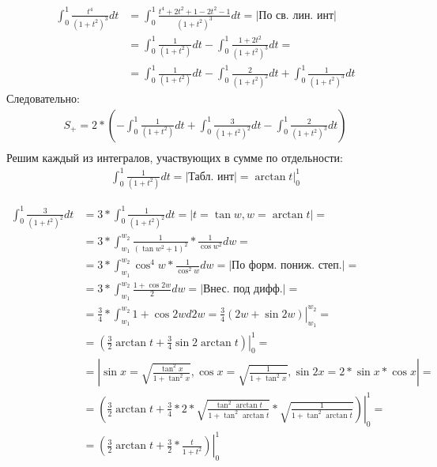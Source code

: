 \documentclass[12pt, a4paper]{article}
\begin{document}
\begin{equation*}
\begin{aligned}
\int_{0}^{1} \frac{t^4}{\left(1+t^2\right)^3} dt &= \int_{0}^{1} \frac{t^4 + 2t^2 + 1 -2t^2 - 1}{\left(1+t^2\right)^3} dt = |\text{По св. лин. инт}|\\
&= \int_{0}^{1} \frac{1}{\left(1+t^2\right)} dt - \int_{0}^{1} \frac{1+2t^2}{\left(1+t^2\right)^3} dt =\\
&= \int_{0}^{1} \frac{1}{\left(1+t^2\right)} dt - \int_{0}^{1} \frac{2}{\left(1+t^2\right)^2} dt + \int_{0}^{1} \frac{1}{\left(1+t^2\right)^3} dt
\end{aligned}
\end{equation*}
Следовательно:
\begin{equation*}
\begin{aligned}
S_{+} = 2*\left( -\int_{0}^{1} \frac{1}{\left(1+t^2\right)} dt + \int_{0}^{1} \frac{3}{\left(1+t^2\right)^2} dt - \int_{0}^{1} \frac{2}{\left(1+t^2\right)^3} dt\right)\\
\end{aligned}
\end{equation*}
Решим каждый из интегралов, участвующих в сумме по отдельности:
\begin{equation*}
\begin{aligned}
\int_{0}^{1} \frac{1}{\left(1+t^2\right)} dt = |\text{Табл. инт}| = \left.\arctan{t}\right|_0^1
\end{aligned}
\end{equation*}

\begin{equation*}
\begin{aligned}
\int_{0}^{1} \frac{3}{\left(1+t^2\right)^2} dt &=3 * \int_{0}^{1} \frac{1}{\left(1+t^2\right)^2} dt = |t = \tan{w}, w = \arctan{t}| =\\
&=3 * \int_{w_1}^{w_2} \frac{1}{\left(\tan{w}^2+1\right)^2} * \frac{1}{\cos{w}^2} dw = \\
&= 3 * \int_{w_1}^{w_2} \cos^4{w} * \frac{1}{\cos^2{w}} dw = |\text{По форм. пониж. степ.}| =\\
&= 3 * \int_{w_1}^{w_2} \frac{1+\cos{2w}}{2} dw = |\text{Внес. под дифф.}| =\\
&= \frac{3}{4} * \int_{w_1}^{w_2} 1+\cos{2w} d2w =\left. \frac{3}{4}(2w +\sin{2w})\right|_{w_1}^{w_2} =\\
&= \left.\left(\frac{3}{2}\arctan{t} + \frac{3}{4}\sin{2\arctan{t}}\right)\right|_0^1 =\\
&= |\sin{x}=\sqrt{\frac{\tan^2{x}}{1+\tan^2{x}}},\cos{x}=\sqrt{\frac{1}{1+\tan^2{x}}}, \sin{2x}=2*\sin{x}*\cos{x}| =\\
&= \left.\left(\frac{3}{2}\arctan{t} + \frac{3}{4} * 2 *\sqrt{\frac{\tan^2{\arctan{t}}}{1+\tan^2{\arctan{t}}}}*\sqrt{\frac{1}{1+\tan^2{\arctan{t}}}}\right)\right|_0^1 =\\
&=\left.\left(\frac{3}{2}\arctan{t} + \frac{3}{2}*\frac{t}{1+t^2}\right)\right|_0^1
\end{aligned}
\end{equation*}
\end{document}
